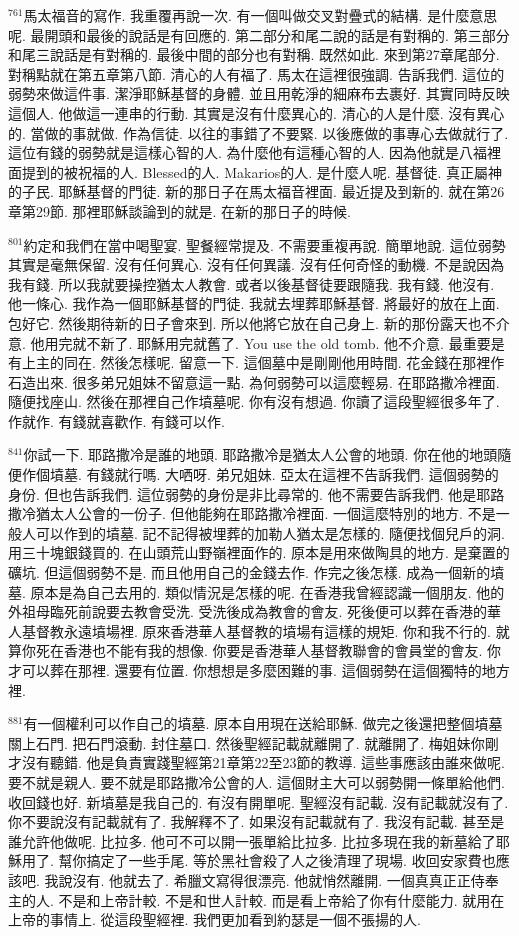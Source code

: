 \documentclass{book}
\begin{document}
$^{761}$馬太福音的寫作.
我重覆再說一次.
有一個叫做交叉對疊式的結構.
是什麼意思呢.
最開頭和最後的說話是有回應的.
第二部分和尾二說的話是有對稱的.
第三部分和尾三說話是有對稱的.
最後中間的部分也有對稱.
既然如此.
來到第27章尾部分.
對稱點就在第五章第八節.
清心的人有福了.
馬太在這裡很強調.
告訴我們.
這位的弱勢來做這件事.
潔淨耶穌基督的身體.
並且用乾淨的細麻布去裹好.
其實同時反映這個人.
他做這一連串的行動.
其實是沒有什麼異心的.
清心的人是什麼.
沒有異心的.
當做的事就做.
作為信徒.
以往的事錯了不要緊.
以後應做的事專心去做就行了.
這位有錢的弱勢就是這樣心智的人.
為什麼他有這種心智的人.
因為他就是八福裡面提到的被祝福的人.
Blessed的人.
Makarios的人.
是什麼人呢.
基督徒.
真正屬神的子民.
耶穌基督的門徒.
新的那日子在馬太福音裡面.
最近提及到新的.
就在第26章第29節.
那裡耶穌談論到的就是.
在新的那日子的時候.

$^{801}$約定和我們在當中喝聖宴.
聖餐經常提及.
不需要重複再說.
簡單地說.
這位弱勢其實是毫無保留.
沒有任何異心.
沒有任何異議.
沒有任何奇怪的動機.
不是說因為我有錢.
所以我就要操控猶太人教會.
或者以後基督徒要跟隨我.
我有錢.
他沒有.
他一條心.
我作為一個耶穌基督的門徒.
我就去埋葬耶穌基督.
將最好的放在上面.
包好它.
然後期待新的日子會來到.
所以他將它放在自己身上.
新的那份露天也不介意.
他用完就不新了.
耶穌用完就舊了.
You use the old tomb.
他不介意.
最重要是有上主的同在.
然後怎樣呢.
留意一下.
這個墓中是剛剛他用時間.
花金錢在那裡作石造出來.
很多弟兄姐妹不留意這一點.
為何弱勢可以這麼輕易.
在耶路撒冷裡面.
隨便找座山.
然後在那裡自己作墳墓呢.
你有沒有想過.
你讀了這段聖經很多年了.
作就作.
有錢就喜歡作.
有錢可以作.

$^{841}$你試一下.
耶路撒冷是誰的地頭.
耶路撒冷是猶太人公會的地頭.
你在他的地頭隨便作個墳墓.
有錢就行嗎.
大哂呀.
弟兄姐妹.
亞太在這裡不告訴我們.
這個弱勢的身份.
但也告訴我們.
這位弱勢的身份是非比尋常的.
他不需要告訴我們.
他是耶路撒冷猶太人公會的一份子.
但他能夠在耶路撒冷裡面.
一個這麼特別的地方.
不是一般人可以作到的墳墓.
記不記得被埋葬的加勒人猶太是怎樣的.
隨便找個兒戶的洞.
用三十塊銀錢買的.
在山頭荒山野嶺裡面作的.
原本是用來做陶具的地方.
是棄置的礦坑.
但這個弱勢不是.
而且他用自己的金錢去作.
作完之後怎樣.
成為一個新的墳墓.
原本是為自己去用的.
類似情況是怎樣的呢.
在香港我曾經認識一個朋友.
他的外祖母臨死前說要去教會受洗.
受洗後成為教會的會友.
死後便可以葬在香港的華人基督教永遠墳場裡.
原來香港華人基督教的墳場有這樣的規矩.
你和我不行的.
就算你死在香港也不能有我的想像.
你要是香港華人基督教聯會的會員堂的會友.
你才可以葬在那裡.
還要有位置.
你想想是多麼困難的事.
這個弱勢在這個獨特的地方裡.

$^{881}$有一個權利可以作自己的墳墓.
原本自用現在送給耶穌.
做完之後還把整個墳墓關上石門.
把石門滾動.
封住墓口.
然後聖經記載就離開了.
就離開了.
梅姐妹你剛才沒有聽錯.
他是負責實踐聖經第21章第22至23節的教導.
這些事應該由誰來做呢.
要不就是親人.
要不就是耶路撒冷公會的人.
這個財主大可以弱勢開一條單給他們.
收回錢也好.
新墳墓是我自己的.
有沒有開單呢.
聖經沒有記載.
沒有記載就沒有了.
你不要說沒有記載就有了.
我解釋不了.
如果沒有記載就有了.
我沒有記載.
甚至是誰允許他做呢.
比拉多.
他可不可以開一張單給比拉多.
比拉多現在我的新墓給了耶穌用了.
幫你搞定了一些手尾.
等於黑社會殺了人之後清理了現場.
收回安家費也應該吧.
我說沒有.
他就去了.
希臘文寫得很漂亮.
他就悄然離開.
一個真真正正侍奉主的人.
不是和上帝計較.
不是和世人計較.
而是看上帝給了你有什麼能力.
就用在上帝的事情上.
從這段聖經裡.
我們更加看到約瑟是一個不張揚的人.
\end{document}
